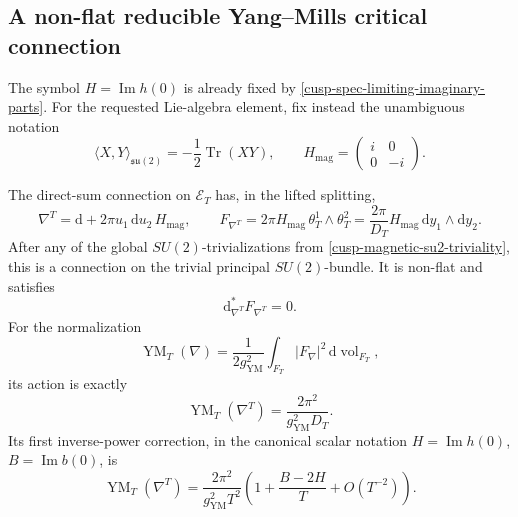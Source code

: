 \subsection{A non-flat reducible Yang--Mills critical connection}

The symbol \(H=\operatorname{Im}h(0)\) is already fixed by
\cref{cusp-spec-limiting-imaginary-parts}.  For the requested Lie-algebra
element, fix instead the unambiguous notation
\begin{equation}
 \langle X,Y\rangle_{\mathfrak{su}(2)}
   =-\frac12\operatorname{Tr}(XY),
 \qquad
 H_{\mathrm{mag}}=\begin{pmatrix}i&0\\0&-i\end{pmatrix}.
 \label{cusp-magnetic-su2-normalization}
\end{equation}
\begin{theorem}
\label{cusp-magnetic-ym-critical-point}
The direct-sum connection on \(\mathscr E_T\) has, in the lifted splitting,
\begin{equation}
 \nabla^T=\mathrm d+2\pi u_1\,\mathrm du_2\,H_{\mathrm{mag}},
 \qquad
 F_{\nabla^T}
 =2\pi H_{\mathrm{mag}}\,\theta_T^1\wedge\theta_T^2
 =\frac{2\pi}{D_T}H_{\mathrm{mag}}\,\mathrm dy_1\wedge\mathrm dy_2.
 \label{cusp-magnetic-su2-curvature}
\end{equation}
After any of the global \(SU(2)\)-trivializations from
 \cref{cusp-magnetic-su2-triviality}, this is a connection on the
trivial principal \(SU(2)\)-bundle.  It is non-flat and satisfies
\[
 \mathrm d_{\nabla^T}^*F_{\nabla^T}=0.
\]
For the normalization
\begin{equation}
 \operatorname{YM}_T(\nabla)
 =\frac1{2g_{\mathrm{YM}}^2}
  \int_{F_T}\lvert F_\nabla\rvert^2\,
  \mathrm d\operatorname{vol}_{F_T},
 \label{cusp-magnetic-action-normalization}
\end{equation}
its action is exactly
\begin{equation}
 \operatorname{YM}_T(\nabla^T)
 =\frac{2\pi^2}{g_{\mathrm{YM}}^2D_T}.
 \label{cusp-magnetic-exact-action}
\end{equation}
Its first inverse-power correction, in the canonical scalar notation
\(H=\operatorname{Im}h(0)\), \(B=\operatorname{Im}b(0)\), is
\begin{equation}
 \operatorname{YM}_T(\nabla^T)
 =\frac{2\pi^2}{g_{\mathrm{YM}}^2T^2}
  \left(1+\frac{B-2H}{T}
  +O(T^{-2})\right).
 \label{cusp-magnetic-action-first-correction}
\end{equation}
\end{theorem}

